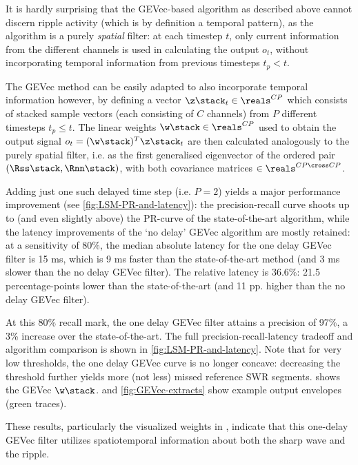 \label{sec:spatiotemporal}

It is hardly surprising that the GEVec-based algorithm as described above cannot discern ripple activity (which is by definition a temporal pattern), as the algorithm is a purely \emph{spatial} filter: at each timestep $t$, only current information from the different channels is used in calculating the output $o_t$, without incorporating temporal information from previous timesteps $t_p < t$.

The GEVec method can be easily adapted to also incorporate temporal information however, by defining a vector $\z\stack_t \in \reals^{CP}$ which consists of stacked sample vectors (each consisting of $C$ channels) from $P$ different timesteps $t_p \leq t$. The linear weights $\w\stack \in \reals^{CP}$ used to obtain the output signal $o_t = (\w\stack)^T \z\stack_t$ are then calculated analogously to the purely spatial filter, i.e. as the first generalised eigenvector of the ordered pair $(\Rss\stack, \Rnn\stack)$, with both covariance matrices $\in \reals^{CP \cross CP}$.

Adding just one such delayed time step (i.e. $P = 2$) yields a major performance improvement (see \cref{fig:LSM-PR-and-latency}): the precision-recall curve shoots up to (and even slightly above) the PR-curve of the state-of-the-art algorithm, while the latency improvements of the `no delay' GEVec algorithm are mostly retained: at a sensitivity of 80\%, the median absolute latency for the one delay GEVec filter is 15 ms, which is 9 ms faster than the state-of-the-art method (and 3 ms slower than the no delay GEVec filter). The relative latency is 36.6\%: 21.5 percentage-points lower than the state-of-the-art (and 11 pp. higher than the no delay GEVec filter).

At this 80\% recall mark, the one delay GEVec filter attains a precision of 97\%, a 3\% increase over the state-of-the-art. The full precision-recall-latency tradeoff and algorithm comparison is shown in \cref{fig:LSM-PR-and-latency}. Note that for very low thresholds, the one delay GEVec curve is no longer concave: decreasing the threshold further yields more (not less) missed reference SWR segments.  shows the GEVec $\w\stack$.  and \cref{fig:GEVec-extracts} show example output envelopes (green traces).

These results, particularly the visualized weights in , indicate that this one-delay GEVec filter utilizes spatiotemporal information about both the sharp wave and the ripple.
